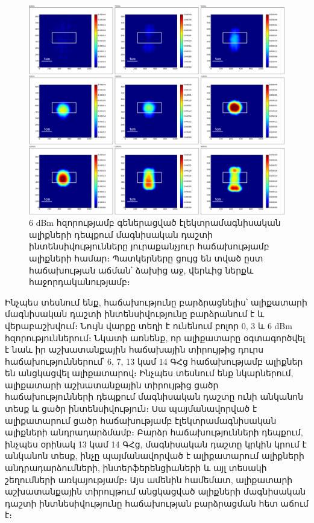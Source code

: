 \documentclass[12pt, fleqn]{report}
\begin{document}
\begin{figure}
    \begin{adjustwidth}{-1.5cm}{}
    \centering
    \includegraphics[width=1.0\textwidth]{data/experiment-results/free field of antenna, 6-14ghz, 6dbm generator output, distance 5mm.png}
    \caption{6 dBm հզորությամբ գեներացված էլեկտրամագնիսական ալիքների դեպքում մագնիսական դաշտի ինտենսիվությունները յուրաքանչյուր հաճախությամբ ալիքների համար։ Պատկերները ցույց են տված ըստ հաճախության աճման՝ ձախից աջ, վերևից ներքև հաջորդականությամբ։}
    \label{fig:6dBm-diagram}
\end{adjustwidth}
\end{figure}
Ինչպես տեսնում ենք, հաճախությունը բարձրացնելիս՝ ալիքատարի մագնիսական դաշտի ինտենսիվությունը բարձրանում է և վերաբաշխվում։ Նույն վարքը տեղի է ունենում բոլոր 0, 3 և 6 dBm հզորություններում։ Նկատի առնենք, որ ալիքատարը օգտագործվել է նաև իր աշխատանքային հաճախային տիրույթից դուրս հաճախություններում՝ 6, 7, 13 կամ 14 ԳՀց հաճախությամբ ալիքներ են անցկացվել ալիքատարով։ Ինչպես տեսնում ենք նկարներում, ալիքատարի աշխատանքային տիրույթից ցածր հաճախությունների դեպքում մագնիսական դաշտը ունի անկանոն տեսք և ցածր ինտենսիվություն։ Սա պայմանավորված է ալիքատարում ցածր հաճախությամբ էլեկտրամագնիսական ալիքների անդրադարձմամբ։ Բարձր հաճախությունների դեպքում, ինչպես օրինակ 13 կամ 14 ԳՀց, մագնիսական դաշտը կրկին կրում է անկանոն տեսք, ինչը պայմանավորված է ալիքատարում ալիքների անդրադարձումների, ինտերֆերենցիաների և այլ տեսակի շեղումների առկայությամբ։ Այս ամենին համեմատ, ալիքատարի աշխատանքային տիրույթում անցկացված ալիքների մագնիսական դաշտի ինտնեսիվությունը հաճախության բարձրացման հետ աճում է։
\end{document}
